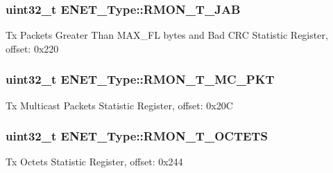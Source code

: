 \subsubsection[{\texorpdfstring{R\+M\+O\+N\+\_\+\+T\+\_\+\+J\+AB}{RMON_T_JAB}}]{ uint32\+\_\+t E\+N\+E\+T\+\_\+\+Type\+::\+R\+M\+O\+N\+\_\+\+T\+\_\+\+J\+AB}\hypertarget{structENET__Type_a2547c2d67722eb980a78348a8482ffbb}{}\label{structENET__Type_a2547c2d67722eb980a78348a8482ffbb}
Tx Packets Greater Than M\+A\+X\+\_\+\+FL bytes and Bad C\+RC Statistic Register, offset\+: 0x220 
\subsubsection[{\texorpdfstring{R\+M\+O\+N\+\_\+\+T\+\_\+\+M\+C\+\_\+\+P\+KT}{RMON_T_MC_PKT}}]{ uint32\+\_\+t E\+N\+E\+T\+\_\+\+Type\+::\+R\+M\+O\+N\+\_\+\+T\+\_\+\+M\+C\+\_\+\+P\+KT}\hypertarget{structENET__Type_aaf4ed69234d69c690c1652275c4d4eab}{}\label{structENET__Type_aaf4ed69234d69c690c1652275c4d4eab}
Tx Multicast Packets Statistic Register, offset\+: 0x20C 
\subsubsection[{\texorpdfstring{R\+M\+O\+N\+\_\+\+T\+\_\+\+O\+C\+T\+E\+TS}{RMON_T_OCTETS}}]{ uint32\+\_\+t E\+N\+E\+T\+\_\+\+Type\+::\+R\+M\+O\+N\+\_\+\+T\+\_\+\+O\+C\+T\+E\+TS}\hypertarget{structENET__Type_aea3f181382dad01eb60af23c56a7d9d4}{}\label{structENET__Type_aea3f181382dad01eb60af23c56a7d9d4}
Tx Octets Statistic Register, offset\+: 0x244 
